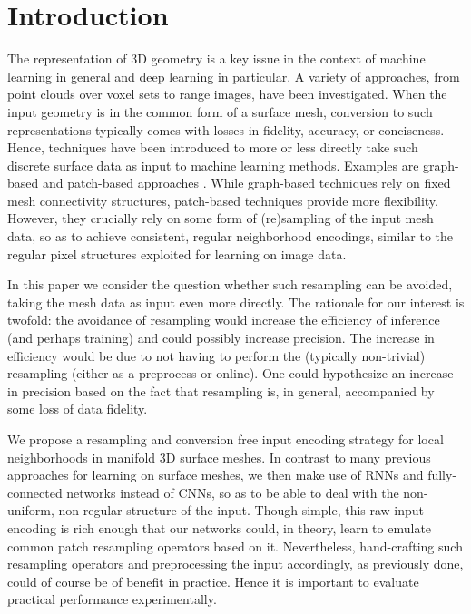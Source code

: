 \documentclass[runningheads]{llncs}
\begin{document}
\section{Introduction}
The representation of 3D geometry is a key issue in the context of machine learning in general and deep learning in particular. A variety of approaches, from point clouds over voxel sets to range images, have been investigated. 
When the input geometry is in the common form of a surface mesh, conversion to such representations typically comes with losses in fidelity, accuracy, or conciseness. 
Hence, techniques have been introduced to more or less directly take such discrete surface data as input to machine learning methods. Examples are graph-based \cite{kostrikov2017surface,defferrard2016convolutional} and patch-based approaches \cite{masci2015geodesic,boscaini2016learning,monti2017geometric}.
While graph-based techniques rely on fixed mesh connectivity structures, patch-based techniques provide more flexibility. However, they crucially rely on some form of (re)sampling of the input mesh data, so as to achieve consistent, regular neighborhood encodings, similar to the regular pixel structures exploited for learning on image data.

In this paper we consider the question whether such resampling can be avoided, taking the mesh data as input even more directly. The rationale for our interest is twofold: the avoidance of resampling would increase the efficiency of inference (and perhaps training) and could possibly increase precision. The increase in efficiency would be due to not having to perform the (typically non-trivial) resampling (either as a preprocess or online). One could hypothesize an increase in precision based on the fact that resampling is, in general, accompanied by some loss of data fidelity.

We propose a resampling and conversion free input encoding strategy for local neighborhoods in manifold 3D surface meshes. In contrast to many previous approaches for learning on surface meshes, we then make use of RNNs and fully-connected networks instead of CNNs, so as to be able to deal with the non-uniform, non-regular structure of the input.
Though simple, this raw input encoding is rich enough that our networks could, in theory, learn to emulate common patch resampling operators based on it. Nevertheless, hand-crafting such resampling operators and preprocessing the input accordingly, as previously done, could of course be of benefit in practice. Hence it is important to evaluate practical performance experimentally.
\end{document}
